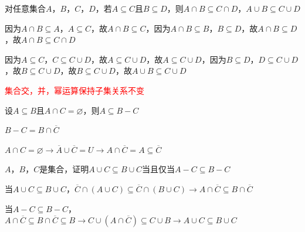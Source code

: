 \documentclass[xetex,10pt,aspectratio=43]{beamer}
\begin{document}
	\begin{frame}{对任意集合$A$，$B$，$C$，$D$，若$A\subseteq C$且$B\subseteq D$，则$A\cap B\subseteq C\cap D$，$A\cup B\subseteq C\cup D$}
		
	因为$A\cap B\subseteq A$，$A\subseteq C$，故$A\cap B\subseteq C$，因为$A\cap B\subseteq B$，$B\subseteq D$，故$A\cap B\subseteq D$，故$A\cap B\subseteq C\cap D$
	
	因为$A\subseteq C$，$C\subseteq C\cup D$，故$A\subseteq C\cup D$，故$A\subseteq C\cup D$，因为$B\subseteq D$，$D\subseteq C\cup D$，故$B\subseteq C\cup D$，故$B\subseteq C\cup D$，故$A\cup B\subseteq C\cup D$
	
	\vspace{0.5cm}
		
	\textcolor{red}{集合交，并，幂运算保持子集关系不变}
	
	\end{frame}

	\begin{frame}{设$A\subseteq B$且$A\cap C=\varnothing$，则$A\subseteq B-C$}
		
	$B-C=B\cap\overline{C}$
	
	$A\cap C=\varnothing\rightarrow \overline{A}\cup\overline{C}=U\rightarrow A\cap\overline{C}=A\subseteq\overline{C}$
	
	\end{frame}

	\begin{frame}{$A$，$B$，$C$是集合，证明$A\cup C\subseteq B\cup C$当且仅当$A-C\subseteq B-C$}
		
	当$A\cup C\subseteq B\cup C$，$\overline{C}\cap(A\cup C)\subseteq \overline{C}\cap(B\cup C)\rightarrow A\cap\overline{C}\subseteq B\cap\overline{C}$
	
	当$A-C\subseteq B-C$，$A\cap\overline{C}\subseteq B\cap\overline{C}\subseteq B\rightarrow C\cup(A\cap\overline{C})\subseteq C\cup B\rightarrow A\cup C\subseteq B\cup C$
	
	\end{frame}
\end{document}
